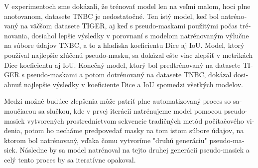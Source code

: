 \begin{otherlanguage}{slovak}
V experimentoch sme dokázali, že trénovať model len na veľmi malom, hoci plne anotovanom, datasete TNBC je nedostatočné. Ten istý model, keď bol natrénovaný na väčšom datasete TIGER, aj keď s pseudo-maskami použitými počas trénovania, dosiahol lepšie výsledky v porovnaní s modelom natrénovaným výlučne na súbore údajov TNBC, a to z hľadiska koeficientu Dice aj IoU. Model, ktorý používal najlepšie zlúčenú pseudo-masku, sa dokázal ešte viac zlepšiť v metrikách Dice koeficientu aj IoU. Konečný model, ktorý bol predtrénovaný na datasete TIGER s pseudo-maskami a potom dotrénovaný na datasete TNBC, dokázal dosiahnuť najlepšie výsledky v koeficiente Dice a IoU spomedzi všetkých modelov.

Medzi možné budúce zlepšenia môže patriť plne automatizovaný proces so samoučiacou sa slučkou, kde v prvej iterácii natrénujeme model pomocou pseudo-masiek vytvorených prostredníctvom sekvencie tradičných metód počítačového videnia, potom ho necháme predpovedať masky na tom istom súbore údajov, na ktorom bol natrénovaný, vďaka čomu vytvoríme "druhú generáciu" pseudo-masiek. Následne by sa model natrénoval na tejto druhej generácii pseudo-masiek a celý tento proces by sa iteratívne opakoval.

\end{otherlanguage}